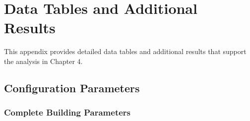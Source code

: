 \chapter{Data Tables and Additional Results}
\label{app:data}

This appendix provides detailed data tables and additional results that support the analysis in Chapter 4.

\section{Configuration Parameters}
\label{app:config_params}

\subsection{Complete Building Parameters}

